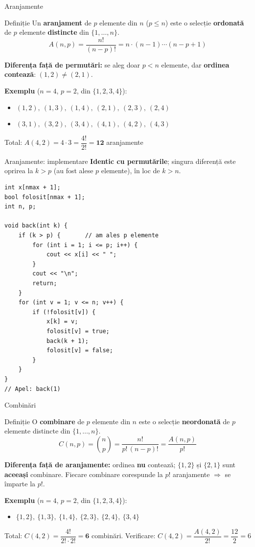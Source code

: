 \documentclass[8pt,mathserif]{beamer}
\begin{document}
\begin{frame}{Aranjamente}
  \begin{block}{Definiție}
    Un \textbf{aranjament} de $p$ elemente din $n$ ($p \le n$) este o selecție \textbf{ordonată} de $p$ elemente \textbf{distincte} din $\{1, \ldots, n\}$.
    \[ A(n,p) = \frac{n!}{(n-p)!} = n \cdot (n{-}1) \cdots (n{-}p{+}1) \]
  \end{block}
  \textbf{Diferența față de permutări:} se aleg doar $p < n$ elemente, dar \textbf{ordinea contează}: $(1,2) \ne (2,1)$.
  \smallskip

  \textbf{Exemplu} ($n = 4$, $p = 2$, din $\{1,2,3,4\}$):
  \begin{itemize}
    \item[] $(1,2),\ (1,3),\ (1,4),\ (2,1),\ (2,3),\ (2,4)$
    \item[] $(3,1),\ (3,2),\ (3,4),\ (4,1),\ (4,2),\ (4,3)$
  \end{itemize}
  Total: $A(4,2) = 4 \cdot 3 = \dfrac{4!}{2!} = \mathbf{12}$ aranjamente
\end{frame}

\begin{frame}[fragile]{Aranjamente: implementare}
  \textbf{Identic cu permutările}; singura diferență este oprirea la $k > p$ (au fost alese $p$ elemente), în loc de $k > n$.
  \begin{lstlisting}
int x[nmax + 1];
bool folosit[nmax + 1];
int n, p;

void back(int k) {
    if (k > p) {       // am ales p elemente
        for (int i = 1; i <= p; i++) {
            cout << x[i] << " ";
        }
        cout << "\n";
        return;
    }
    for (int v = 1; v <= n; v++) {
        if (!folosit[v]) {
            x[k] = v;
            folosit[v] = true;
            back(k + 1);
            folosit[v] = false;
        }
    }
}
// Apel: back(1)
  \end{lstlisting}
\end{frame}

\begin{frame}{Combinări}
  \begin{block}{Definiție}
    O \textbf{combinare} de $p$ elemente din $n$ este o selecție \textbf{neordonată} de $p$ elemente distincte din $\{1, \ldots, n\}$.
    \[ C(n,p) = \binom{n}{p} = \frac{n!}{p!\,(n-p)!} = \frac{A(n,p)}{p!} \]
  \end{block}
  \textbf{Diferența față de aranjamente:} ordinea \textbf{nu} contează; $\{1,2\}$ și $\{2,1\}$ sunt \textbf{aceeași} combinare. Fiecare combinare corespunde la $p!$ aranjamente $\Rightarrow$ se împarte la $p!$.
  \smallskip

  \textbf{Exemplu} ($n = 4$, $p = 2$, din $\{1,2,3,4\}$):
  \begin{itemize}
    \item[] $\{1,2\},\ \{1,3\},\ \{1,4\},\ \{2,3\},\ \{2,4\},\ \{3,4\}$
  \end{itemize}
  Total: $C(4,2) = \dfrac{4!}{2!\cdot 2!} = \mathbf{6}$ combinări. Verificare: $C(4,2) = \dfrac{A(4,2)}{2!} = \dfrac{12}{2} = 6$
\end{frame}
\end{document}
